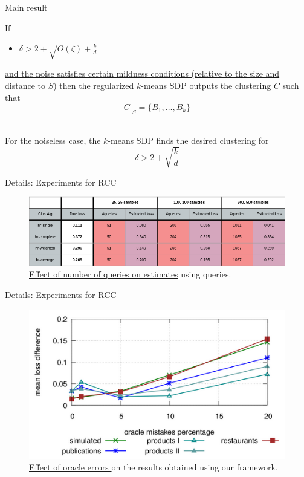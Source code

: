 \documentclass{beamer}
\begin{document}
\begin{frame}{Main result}
	\begin{theorem}
	 If  
	\begin{itemize}
	  \item $\delta > 2 + \sqrt{ O(\zeta) + \frac{k}{d}}$ 
	\end{itemize}
	\hyperlink{optimizationNoise}{and the noise satisfies certain mildness conditions (relative to the size and} distance to $S$) then the regularized $k$-means SDP outputs the clustering $C$ such that
	$$C|_{S} = \{B_1, \ldots, B_k\}$$
	\end{theorem}
	
	\\
	For the noiseless case, the $k$-means SDP finds the desired clustering for $$\delta > 2 + \sqrt{\frac{k}{d}}$$
\end{frame}

\begin{frame}[label=detailsRCCExperiments]{Details: Experiments for RCC}
	\begin{figure}
	\includegraphics[trim=0 0 0 0,scale=0.4]{figures/deDuplication/experimentsQueries.png}
	\caption{\hyperlink{RCCExperiments}{Effect of number of queries on estimates} using queries.}
	\end{figure}
\end{frame}

\begin{frame}{Details: Experiments for RCC}
	\begin{figure}
	\includegraphics[trim=0 0 0 0,scale=0.5]{figures/deDuplication/experimentsNoisyOracle.png}
	\caption{\hyperlink{RCCExperiments}{Effect of oracle errors } on the results obtained using our framework.}
	\end{figure}
\end{frame}
\end{document}
